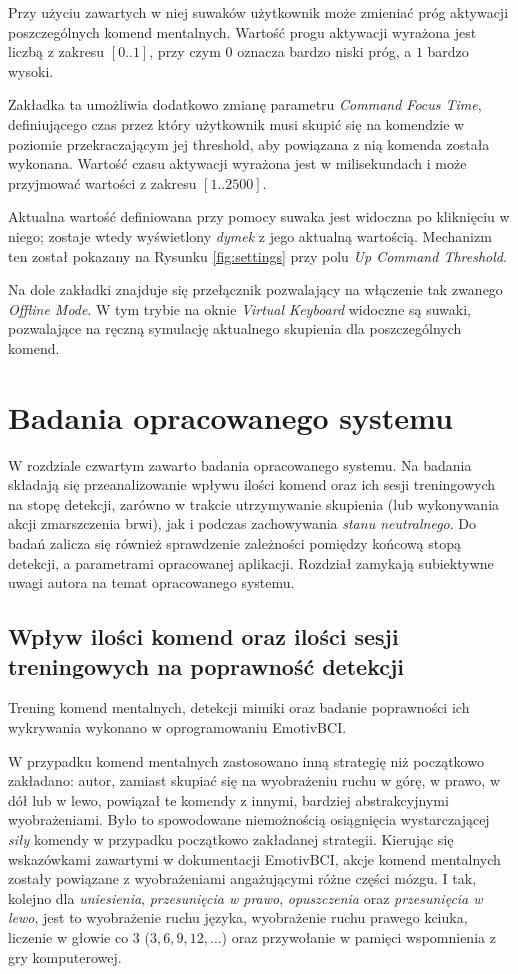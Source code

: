 \documentclass[skorowidz,skroty]{dyplomWEZUT}
\begin{document}
Przy użyciu zawartych w niej suwaków użytkownik może zmieniać próg aktywacji poszczególnych komend mentalnych. Wartość progu aktywacji wyrażona jest liczbą z zakresu $[0..1]$, przy czym $0$ oznacza bardzo niski próg, a $1$ bardzo wysoki.

Zakładka ta umożliwia dodatkowo zmianę parametru \textit{Command Focus Time}, definiującego czas przez który użytkownik musi skupić się na komendzie w poziomie przekraczającym jej threshold, aby powiązana z nią komenda została wykonana. Wartość czasu aktywacji wyrażona jest w milisekundach i może przyjmować wartości z zakresu $[1..2500]$.

Aktualna wartość definiowana przy pomocy suwaka jest widoczna po kliknięciu w niego; zostaje wtedy wyświetlony \textit{dymek} z jego aktualną wartością. Mechanizm ten został pokazany na Rysunku \vref{fig:settings} przy polu \textit{Up Command Threshold}.

Na dole zakładki znajduje się przełącznik pozwalający na włączenie tak zwanego \textit{Offline Mode}. W tym trybie na oknie \textit{Virtual Keyboard} widoczne są suwaki, pozwalające na ręczną symulację aktualnego skupienia dla poszczególnych komend.

\chapter{Badania opracowanego systemu}
W rozdziale czwartym zawarto badania opracowanego systemu. Na badania składają się przeanalizowanie wpływu ilości komend oraz ich sesji treningowych na stopę detekcji, zarówno w trakcie utrzymywanie skupienia (lub wykonywania akcji zmarszczenia brwi), jak i podczas zachowywania \textit{stanu neutralnego}. Do badań zalicza się również sprawdzenie zależności pomiędzy końcową stopą detekcji, a parametrami opracowanej aplikacji. Rozdział zamykają subiektywne uwagi autora na temat opracowanego systemu.

\section{Wpływ ilości komend oraz ilości sesji treningowych na poprawność detekcji\label{sec:training_sessions}}
Trening komend mentalnych, detekcji mimiki oraz badanie poprawności ich wykrywania wykonano w oprogramowaniu EmotivBCI.

W przypadku komend mentalnych zastosowano inną strategię niż początkowo zakładano: autor, zamiast skupiać się na wyobrażeniu ruchu w górę, w prawo, w dół lub w lewo, powiązał te komendy z innymi, bardziej abstrakcyjnymi wyobrażeniami. Było to spowodowane niemożnością osiągnięcia wystarczającej \textit{siły} komendy w przypadku początkowo zakładanej strategii. Kierując się wskazówkami zawartymi w dokumentacji EmotivBCI, akcje komend mentalnych zostały powiązane z wyobrażeniami angażującymi różne części mózgu. I tak, kolejno dla \textit{uniesienia}, \textit{przesunięcia w prawo}, \textit{opuszczenia} oraz \textit{przesunięcia w lewo}, jest to wyobrażenie ruchu języka, wyobrażenie ruchu prawego kciuka, liczenie w głowie co $3$ ($3, 6, 9, 12, \dots$) oraz przywołanie w pamięci wspomnienia z gry komputerowej. 
\end{document}
